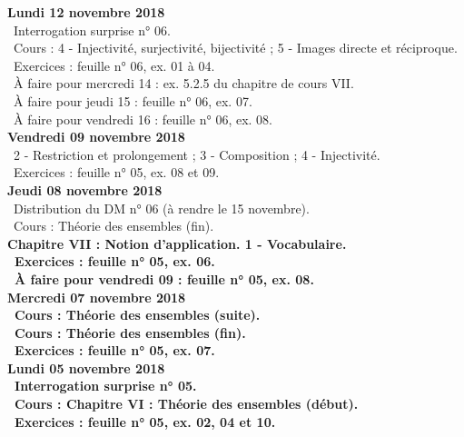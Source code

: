 \documentclass[12pt,a4paper]{article}
\begin{document}
\noindent\textbf{Lundi 12 novembre 2018}\\
\bu\ Interrogation surprise n° 06.\\
\bu\ Cours : 4 - Injectivité, surjectivité, bijectivité ; 5 - Images directe et réciproque.\\
\bu\ Exercices : feuille n° 06, ex. 01 à 04.\\
\bu\ À faire pour mercredi 14 : ex. 5.2.5 du chapitre de cours VII.\\
\bu\ À faire pour jeudi 15 : feuille n° 06, ex. 07.\\
\bu\ À faire pour vendredi 16 : feuille n° 06, ex. 08.\vspace{.4cm}\\

\noindent\textbf{Vendredi 09 novembre 2018}\\
\cours\ 2 - Restriction et prolongement ; 3 - Composition ; 4 - Injectivité.\\
\bu\ Exercices : feuille n° 05, ex. 08 et 09.\vspace{.4cm}\\

\noindent\textbf{Jeudi 08 novembre 2018}\\
\bu\ Distribution du DM n° 06 (à rendre le 15 novembre).\\
\bu\ Cours : Théorie des ensembles (fin).\\
\bf Chapitre VII \rm : Notion d'application. 1 - Vocabulaire.\\
\bu\ Exercices : feuille n° 05, ex. 06.\\
\bu\ À faire pour vendredi 09 : feuille n° 05, ex. 08.\vspace{.4cm}\\
 
\noindent\textbf{\bf Mercredi 07 novembre 2018}\\
\bu\ Cours : Théorie des ensembles (suite).\\
\bu\ Cours : Théorie des ensembles (fin).\\
\bu\ Exercices : feuille n° 05, ex. 07.\vspace{.4cm}\\

\noindent\textbf{Lundi 05 novembre 2018}\\
\bu\ Interrogation surprise n° 05.\\
\bu\ Cours : \bf Chapitre VI \rm : Théorie des ensembles (début).\\
\bu\ Exercices : feuille n° 05, ex. 02, 04 et 10.\vspace{.4cm}\\
\end{document}
